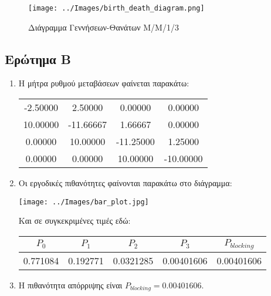 \documentclass[12pt]{article}
\begin{document}
\begin{figure}[H]
    \centering
    \texttt{[image: ../Images/birth\_death\_diagram.png]}
    \caption{Διάγραμμα Γεννήσεων-Θανάτων Μ/Μ/1/3}
    \label{fig:task3ask1}
\end{figure}


\pagebreak
\subsection{Ερώτημα Β}

\begin{enumerate}
    \item{}
        Η μήτρα ρυθμού μεταβάσεων φαίνεται παρακάτω:\\
        \begin{table}[h!]
          \centering
          \begin{tabular}{|c|c|c|c|}
            \hline
              -2.50000&   2.50000&   0.00000&   0.00000 \\
              10.00000& -11.66667&   1.66667&   0.00000 \\
               0.00000&  10.00000& -11.25000&   1.25000 \\
               0.00000&   0.00000&  10.00000& -10.00000 \\
            \hline
          \end{tabular}
        \end{table}

    \item{}
        Οι εργοδικές πιθανότητες φαίνονται παρακάτω στο διάγραμμα:\\
        \begin{center}
            \texttt{[image: ../Images/bar\_plot.jpg]}
        \end{center}

        Και σε συγκεκριμένες τιμές εδώ:\\
        \begin{table}[h!]
          \centering
          \begin{tabular}{|c|c|c|c|c|}
            \hline
            $P_0$ & $P_1$ & $P_2$ & $P_3$ & $P_{blocking}$ \\ \hline
            0.771084 & 0.192771 & 0.0321285 & 0.00401606 & 0.00401606 \\
            \hline
          \end{tabular}
        \end{table}

    \item{}
        Η πιθανότητα απόρριψης είναι $P_{blocking} = 0.00401606$.


\end{enumerate}
\end{document}
